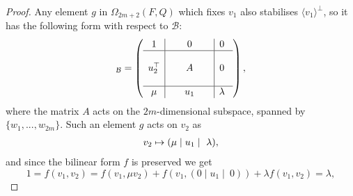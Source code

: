 \begin{proof}
	Any element $g$ in $\Omega_{2m+2}(F,Q)$ which fixes $v_1$ also stabilises
    $\langle v_1 \rangle^{\perp}$, so it has the
    following form with respect to $\mathcal{B}$:
    \begin{equation*}
	[g]_{\mathcal{B}}=\left(
	    \begin{array}{c|c|c}
		1 & 0 & 0\  \\ \hline 
		 & & \\
		u_2^\T &\ \ \ \ \ A\ \ \ \ \  & 0\  \\ 
		 & & \\ \hline 
		\mu & u_1 & \lambda\ 
	    \end{array}
	\right),
    \end{equation*}
    where the matrix $A$ acts on the $2m$-dimensional subspace, 
    spanned by $\{w_1, ..., w_{2m}\}$. Such an element $g$ acts on $v_2$ as
    \begin{equation*}
	\begin{array}{r@{\;}c@{\;}l}
		v_2 & \mapsto & (\mu \mid u_1 \mid\ \lambda),
	\end{array}
    \end{equation*}
    and since the bilinear form $f$ is preserved we get
    \begin{equation*}
	1 = f(v_1,v_2) = f(v_1,\mu v_2) + 
	f(v_1, (0 \mid u_1 \mid\ 0) ) + \lambda f(v_1,v_2) = \lambda,
    \end{equation*}
    

\end{proof}
